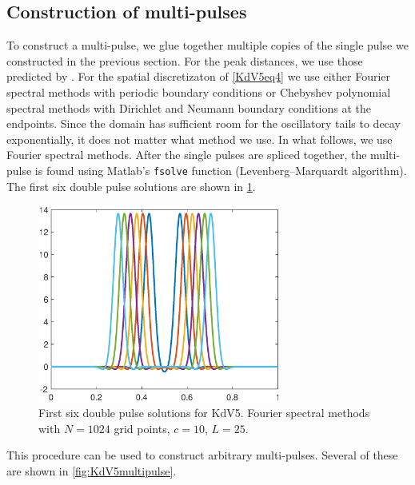 \documentclass[thesis.tex]{subfiles}
\begin{document}
\subsection{Construction of multi-pulses}

To construct a multi-pulse, we glue together multiple copies of the single pulse we constructed in the previous section. For the peak distances, we use those predicted by \cite{SandstedeStrut}. For the spatial discretizaton of \eqref{KdV5eq4} we use either Fourier spectral methods with periodic boundary conditions or Chebyshev polynomial spectral methods with Dirichlet and Neumann boundary conditions at the endpoints. Since the domain has sufficient room for the oscillatory tails to decay exponentially, it does not matter what method we use. In what follows, we use Fourier spectral methods. After the single pulses are spliced together, the multi-pulse is found using Matlab's \texttt{fsolve} function (Levenberg–Marquardt algorithm). The first six double pulse solutions are shown in \cref{fig:KdV5doublepulse}.

\begin{figure}
\begin{center}
\includegraphics[width=8cm]{images/kdv5numerics/double10.eps}
\caption{First six double pulse solutions for KdV5. Fourier spectral methods with $N = 1024$ grid points, $c = 10$, $L = 25$.}
\label{fig:KdV5doublepulse}
\end{center}
\end{figure}

This procedure can be used to construct arbitrary multi-pulses. Several of these are shown in \cref{fig:KdV5multipulse}.
\end{document}
